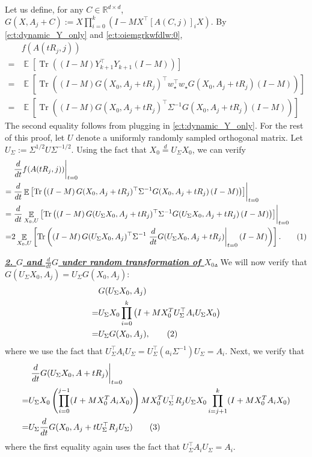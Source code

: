 \documentclass{article}
\DeclareMathOperator{\E}{\mathbb{E}}
\newcommand{\R}{\mathbb{R}}
\newcommand{\wstar}{w_\star}
\newcommand{\emphh}[1]{\textbf{\emph{#1}}}
\DeclareMathOperator{\tr}{Tr}
\newcommand*\lrb[1]{\left[ #1 \right]}
\newcommand*\lrp[1]{\left( #1 \right)}
\newcommand\numberthis{\addtocounter{equation}{1}\tag{\theequation}}
\newcommand*\at[2]{\left.#1\right|_{#2}}
\newcommand{\US}{U_\Sigma}
\begin{document}
Let us define, for any $C\in \R^{d\times d}$, $G(X,A_j + C) := X \prod_{i=0}^{k} \lrp{I - M X^\top \lrb{A(C, j)}_i X}$. By \eqref{e:t:dynamic_Y_only} and \eqref{e:t:oiemgrkwfdlw:0},
\begin{align*}
& f({A(tR_j,j)}) \\
=& \E \lrb{\tr\lrp{\lrp{I-M} Y_{k+1}^{\top} Y_{k+1} \lrp{I-M}}}\\
=& \E \lrb{\tr\lrp{\lrp{I-M} G(X_0,A_j + t{R}_j)^\top \wstar^\top \wstar G(X_0,A_j + t{R}_j) \lrp{I-M}}}\\
=& \E \lrb{\tr\lrp{\lrp{I-M} G(X_0,A_j + t{R}_j)^\top \Sigma^{-1} G(X_0,A_j + t{R}_j) \lrp{I-M}}}
\end{align*}
The second equality follows from plugging in \eqref{e:t:dynamic_Y_only}. For the rest of this proof, let $U$ denote a uniformly randomly sampled orthogonal matrix. Let $\US:= \Sigma^{1/2} U \Sigma^{-1/2}$. Using the fact that $X_0 \overset{d}{=} \US X_0$, we can verify
\begin{align*}
& \at{\frac{d}{dt} f(A(tR_j,j))}{t=0}\\
=& \at{\frac{d}{dt}\E \lrb{\tr\lrp{\lrp{I-M} G(X_0,A_j + t{R}_j)^\top \Sigma^{-1} G(X_0,A_j + t{R}_j) \lrp{I-M}}}}{t=0}\\
=& \at{\frac{d}{dt}\E_{X_0, U} \lrb{\tr\lrp{\lrp{I-M} G(\US X_0, A_j + t R_j)^\top \Sigma^{-1} G(\US X_0, A_j + t R_j) \lrp{I-M}}}}{t=0}\\
=& 2\E_{X_0, U} \lrb{\tr\lrp{\lrp{I-M} G(\US X_0, A_j )^\top \Sigma^{-1} \at{\frac{d}{dt} G(\US X_0, A_j + t R_j)}{t=0} \lrp{I-M}}}.
\numberthis \label{e:t:unkqdwon:4}
\end{align*}

\underline{\emphh{2. $G$ and $\frac{d}{dt} G$ under random transformation of $X_0$.}}
We will now verify that $G(\US X_0, A_j) = \US G(X_0, A_j)$:
\begin{align*}
& G(\US X_0, A_j)\\
=& \US X_0 \prod_{i=0}^{k} \lrp{I + M X_0^T \US^{\top} A_i \US X_0}\\
=& \US G(X_0, A_j),
\numberthis \label{e:t:UG_pnull}
\end{align*}
where we use the fact that $\US^\top A_i \US = \US^\top (a_i \Sigma^{-1}) \US = A_i$. Next, we verify that
\begin{align*}
& \at{\frac{d}{dt} G(\US X_0, A + tR_j)}{t=0}\\
=& \US X_0 \lrp{\prod_{i=0}^{j-1} (I + M X_0^T A_i X_0)} M X_0^T \US^{\top} R_j \US X_0 \prod_{i=j+1}^k (I + M X_0^T A_i X_0)\\
=& \US \frac{d}{dt} G(X_0, A_j + t\US^{\top} R_j \US)
\numberthis \label{e:t:unkqdwon:5}
\end{align*}
where the first equality again uses the fact that $\US^{\top} A_i \US = A_i$.
\end{document}
